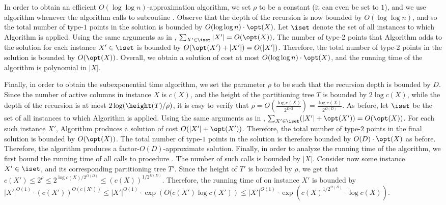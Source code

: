 In order to obtain an efficient $O(\log\log n)$-approximation algorithm, we set $\rho$ to be a constant (it can even be set to $1$), and we use  algorithm \leafBST whenever the algorithm calls to subroutine \leafBST. Observe that the depth of the recursion is now bounded by $O(\log\log n)$, and so the total number of type-$1$ points in the solution is bounded by $O(\log\log n)\cdot \opt(X)$. Let $\iset$ denote the set of all instances to which Algorithm \leafBST is applied. Using the same arguments as in , $\sum_{X'\in \iset}|X'|=O(\opt(X))$. The number of type-2 points that Algorithm \leafBST adds to the solution for each instance $X'\in \iset$ is bounded by $O(\opt(X') + |X'|)=O(|X'|)$. Therefore, the total number of type-2 points in the solution is bounded by $O(\opt(X))$. Overall, we obtain a solution of cost at most $O(\log\log n)\cdot \opt(X)$, and the running time of the algorithm is polynomial in $|X|$.


Finally, in order to obtain the subexponential time algorithm, we set the parameter $\rho$ to be such that the recursion depth is bounded by $D$. 
Since the number of active columns in instance $X$ is $c(X)$, and the height of the partitioning tree $T$ is bounded by $2\log c(X)$, while the depth of the recursion is at most $2\log(\height(T)/\rho)$, it is easy to verify that $\rho=O\left (\frac{\log c(X)}{2^{D/2}}\right )=\frac{\log c(X)}{2^{\Omega(D)}}$.  As before, let $\iset$ be the set of all instances to which Algorithm \leafBST is applied.
 Using the same arguments as in , $\sum_{X'\in \iset}(|X'|+\opt(X'))=O(\opt(X))$. For each such instance $X'$, Algorithm \leafBST produces a solution of cost $O(|X'|+\opt(X'))$. Therefore, the total number of type-$2$ points in the final solution is bounded by $O(\opt(X))$. The total number of type-$1$ points  in the solution is therefore bounded by $O(D)\cdot \opt(X)$ as before. Therefore, the algorithm produces a factor-$O(D)$-approximate solution. Finally, in order to analyze the running time of the algorithm, we first bound the running time of all calls to procedure \leafBST. The number of such calls is bounded by $|X|$. Consider now some instance $X'\in \iset$, and its corresponding partitioning tree $T'$. Since the height of $T'$ is bounded by $\rho$, we get that $c(X')\leq 2^{\rho}\leq 2^{\log c(X)/2^{\Omega(D)}}\leq (c(X))^{1/2^{\Omega(D)}}$. 
 Therefore, the running time of \leafBST on instance $X'$ is bounded by $|X'|^{O(1)}\cdot (c(X'))^{O(c(X'))}\leq |X'|^{O(1)}\cdot \exp\left({O(c(X')\log c(X')}\right )\leq |X'|^{O(1)}\cdot \exp\left({c(X)^{1/2^{\Omega(D)}}\cdot \log c(X)}\right )$.
 
